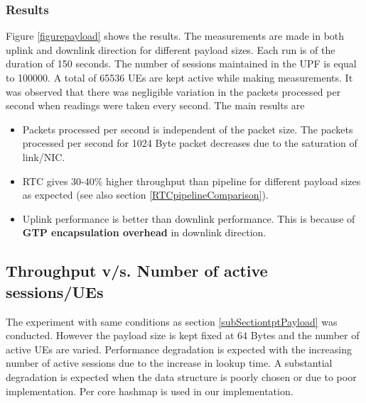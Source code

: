\subsubsection{Results}
Figure \ref{figurepayload} shows the results. The measurements are made in both uplink and
downlink direction for different payload sizes. Each run is of the duration of 150
 seconds. The number of sessions maintained in the UPF is equal to 100000. A total
of 65536 UEs are kept active while making measurements. It was observed that
there was negligible variation in the packets processed per second when readings
were taken every second. The main results are
\begin{itemize}
        \item Packets processed per second is independent of the packet size. The packets
        processed per second for 1024 Byte packet decreases due to the saturation of link/NIC.  
        \item RTC gives 30-40\% higher throughput than pipeline for different payload sizes as expected (see also section \ref{RTCpipelineComparison}).
        \item Uplink performance is better than downlink performance. This is because of
        \textbf{GTP encapsulation overhead} in downlink direction.
 \end{itemize}

\subsection{Throughput v/s. Number of active sessions/UEs}
The experiment with same conditions as section \ref{subSectiontptPayload} was conducted. However the payload size is kept fixed  at 64 Bytes and the number of active UEs are varied.
Performance degradation  is expected with the increasing number of active sessions due to the increase in lookup time. A substantial degradation is expected when the data structure is poorly chosen or due to poor implementation. Per core hashmap is used in our implementation.


